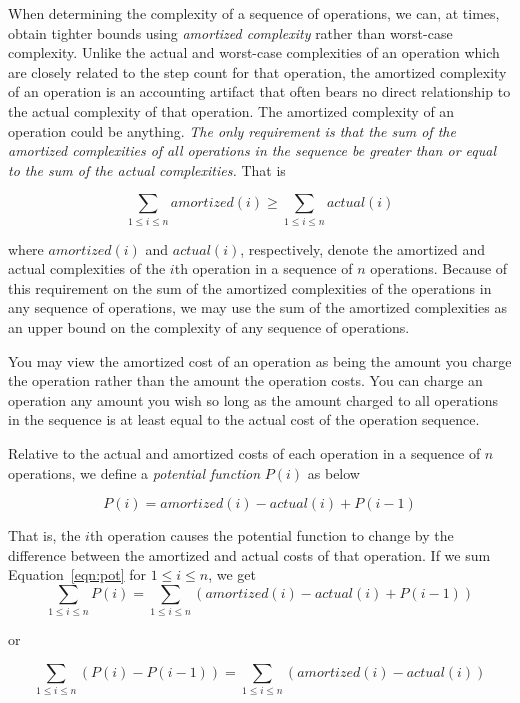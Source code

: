 When determining the complexity of a sequence of operations, we can, at times,
obtain tighter bounds using {\em amortized complexity}
rather than worst-case complexity.
Unlike the actual and worst-case complexities of an operation
which are closely related to the step count for that operation, the
amortized complexity of an operation is an accounting artifact that often
bears no direct relationship to the actual complexity of that operation.
The amortized complexity of an operation could be anything. {\em The
only requirement
is that the sum of the amortized complexities of all operations in the sequence
be greater than or equal to the sum of the actual complexities.} That is

\begin{equation}\label{eqn:amort1}
\sum_{1 \leq i \leq n}amortized(i) \geq
\sum_{1 \leq i \leq  n}actual(i)   
\end{equation}

\noindent
where $amortized(i)$ and $actual(i)$,
respectively, denote the amortized and actual complexities of the
$i$th operation in a sequence of $n$
operations.
Because of this requirement on the sum of the amortized complexities of the
operations in any sequence of operations, we may use the sum of the amortized
complexities as an upper bound on the complexity of any sequence of operations.

You may view the amortized cost of an operation as being the amount you charge
the operation rather than the amount the operation costs. You can charge an
operation any amount you wish so long as the amount charged to all operations
in the sequence is at least equal to the actual cost of the operation sequence.

Relative to the actual and amortized costs of each operation in a sequence
of $n$ operations, we define a {\em potential
function} $P(i)$ as below

\begin{equation}\label{eqn:pot}
P(i) = amortized(i) - actual(i) + P(i-1)
\end{equation}

That is, the $i$th operation causes
the potential function to change by the difference between the amortized
and actual costs of that operation.
If we sum Equation~\ref{eqn:pot} for $1 \leq  i \leq n$, we get
$$\sum_{1 \leq i \leq n} P(i) = \sum_{1 \leq i \leq n} (amortized(i) - actual(i) + P(i-1))$$

or

$$\sum_{1 \leq i \leq n} (P(i) - P(i-1)) = \sum_{1 \leq i \leq n} (amortized(i) - actual(i))$$

